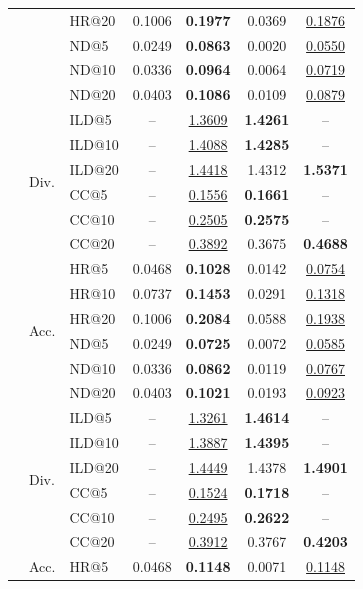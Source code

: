 \begin{table}[t]
\begin{tabular}{lllcccc}
 & & HR@20 & 0.1006 & \textbf{0.1977} & 0.0369 & \underline{0.1876} \\
 & & ND@5  & 0.0249 & \textbf{0.0863} & 0.0020 & \underline{0.0550} \\
 & & ND@10 & 0.0336 & \textbf{0.0964} & 0.0064 & \underline{0.0719} \\
 & & ND@20 & 0.0403 & \textbf{0.1086} & 0.0109 & \underline{0.0879} \\
 & \multirow{6}{*}{Div.}
 & ILD@5  & -- & \underline{1.3609} & \textbf{1.4261} & -- \\
 & & ILD@10 & -- & \underline{1.4088} & \textbf{1.4285} & -- \\
 & & ILD@20 & -- & \underline{1.4418} & 1.4312 & \textbf{1.5371} \\
 & & CC@5   & -- & \underline{0.1556} & \textbf{0.1661} & -- \\
 & & CC@10  & -- & \underline{0.2505} & \textbf{0.2575} & -- \\
 & & CC@20  & -- & \underline{0.3892} & 0.3675 & \textbf{0.4688} \\
\addlinespace[0.3em]
\multirow{12}{*}{First-Individual}
 & \multirow{6}{*}{Acc.}
 & HR@5  & 0.0468 & \textbf{0.1028} & 0.0142 & \underline{0.0754} \\
 & & HR@10 & 0.0737 & \textbf{0.1453} & 0.0291 & \underline{0.1318} \\
 & & HR@20 & 0.1006 & \textbf{0.2084} & 0.0588 & \underline{0.1938} \\
 & & ND@5  & 0.0249 & \textbf{0.0725} & 0.0072 & \underline{0.0585} \\
 & & ND@10 & 0.0336 & \textbf{0.0862} & 0.0119 & \underline{0.0767} \\
 & & ND@20 & 0.0403 & \textbf{0.1021} & 0.0193 & \underline{0.0923} \\
 & \multirow{6}{*}{Div.}
 & ILD@5  & -- & \underline{1.3261} & \textbf{1.4614} & -- \\
 & & ILD@10 & -- & \underline{1.3887} & \textbf{1.4395} & -- \\
 & & ILD@20 & -- & \underline{1.4449} & 1.4378 & \textbf{1.4901} \\
 & & CC@5   & -- & \underline{0.1524} & \textbf{0.1718} & -- \\
 & & CC@10  & -- & \underline{0.2495} & \textbf{0.2622} & -- \\
 & & CC@20  & -- & \underline{0.3912} & 0.3767 & \textbf{0.4203} \\
\addlinespace[0.3em]
\multirow{12}{*}{First-Average}
 & \multirow{6}{*}{Acc.}
 & HR@5  & 0.0468 & \textbf{0.1148} & 0.0071 & \underline{0.1148} \\

\end{tabular}
\end{table}
